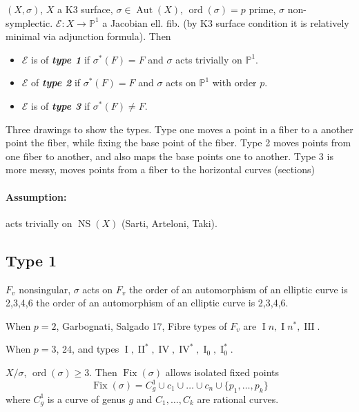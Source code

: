 \begin{defn}
$(X,\sigma)$, $X$ a K3 surface, $\sigma\in\operatorname{Aut}(X)$, $\operatorname{ord}(\sigma)=p$ prime, $\sigma$ non-symplectic. $\mathcal{E}:X\to \mathbb{P}^1$ a Jacobian ell. fib. (by K3 surface condition it is relatively minimal via adjunction formula). Then

\begin{itemize}
\item $\mathcal{E}$ is of \textit{\textbf{type 1}} if $\sigma^*(F)=F$ and $\sigma$ acts trivially on $\mathbb{P}^1$.
\item $\mathcal{E}$ of \textit{\textbf{type 2}} if  $\sigma^*(F)=F$ and $\sigma$ acts on $\mathbb{P}^1$ with order $p$.
\item $\mathcal{E}$ is of \textit{\textbf{type 3}} if $\sigma^*(F)\neq F$.
\end{itemize}
\end{defn}

Three drawings to show the types. Type one moves a point in a fiber to a another point the fiber, while fixing the base point of the fiber. Type 2 moves points from one fiber to another, and also maps the base points one to another. Type 3 is more messy, moves points from a fiber to the horizontal curves (sections)

\paragraph{Assumption:} acts trivially on $\operatorname{NS}(X)$ (Sarti, Arteloni, Taki).

\subsection{Type 1}
$F_v$ nonsingular, $\sigma$ acts on $F_v$ the order of an automorphism of an elliptic curve is 2,3,4,6 the order of an automorphism of an elliptic curve is 2,3,4,6.

When $p=2$, Garbognati, Salgado 17, Fibre types of  $F_v$ are $\operatorname{I}n,\operatorname{I}n^* ,\operatorname{I I I}$.

When $p=3$, 24, and types $\operatorname{I},\operatorname{I I}^* ,\operatorname{IV},\operatorname{IV}^* ,\operatorname{I}_{0},\operatorname{I}_{0}^*$.

$X/\sigma$, $\operatorname{ord}(\sigma)\geq 3$. Then $\operatorname{Fix}(\sigma)$ allows isolated fixed points
\[\operatorname{Fix}(\sigma)=C^1_g \cup c_1\cup \ldots \cup c_n\cup \{p_1,\ldots,p_k\}\]
where $C^1_g$ is a curve of genus $g$ and $C_1,\ldots,C_k$ are rational curves.

